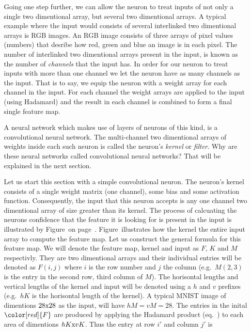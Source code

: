 Going one step further, we can allow the neuron to treat inputs of not only a single two dimentional array, but several two dimentional arrays.
A typical example where the input would consists of several interlinked two dimentional arrays is RGB images.
An RGB image consists of three arrays of pixel values (numbers) that desribe how red, green and blue an image is in each pixel.
The number of interlinked two dimentional arrays present in the input, is known as the number of {\em channels} that the input has.
In order for our neuron to treat inputs with more than one channel we let the neuron have as many channels as the input.
That is to say, we equip the neuron with a weight array for each channel in the input.
For each channel the weight arrays are applied to the input (using Hadamard) and the result in each channel is combined to form a final single feature map.

A neural network which makes use of layers of neurons of this kind, is a convolutional neural network.
The multi-channel two dimentional arrays of weights inside each such neuron is called the neuron's {\em kernel} or {\em filter}.
Why are these neural networks called convolutional neural networks?
That will be explained in the next section.

\startsubsection[title=The convolutional neuron]
Let us start this section with a simple convolutional neuron.
The neuron's kernel consists of a single weight matrix (one channel), some bias and some activation function.
Consequently, the input that this neuron accepts is any one channel two dimentional array of size greater than its kernel.
The process of calcuating the neurons  confidence that the feature it is looking for is present in the input is illustrated by Figure~ on page~.
Figure~ illustrates how the kernel  the entire input array to compute the feature map.
Let us construct the general formula for this feature map.
We will denote the feature map, kernel and input as $F$, $K$ and $M$ respectivly.
They are two dimentional arrays and their individual entries will be denoted as $F(i,j)$ where $i$ is the row number and $j$ the column (e.g.\ $M(2,3)$ is the entry in the second row, third column of $M$).
The horisontal lengths and vertical lengths of the kernel and input will be denoted using a $h$ and $v$ prefixes (e.g.\ $hK$ is the horisontal length of the kernel).
A typical MNIST image of dimentions $28{\rm x}28$ as the input, will have $hM = vM = 28$.
The entries in the inital $\color[red]{F}$ are produced by applying the Hadamard product (eq.~\in[hdprod]) to each area of dimentions $hK{\rm x}vK$.
Thus the entry at row $i'$ and column $j'$ is

